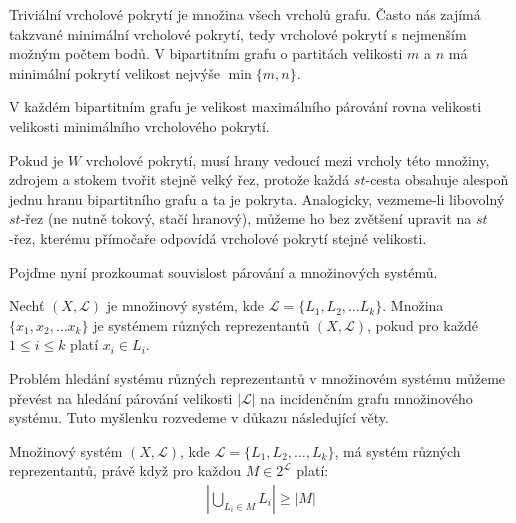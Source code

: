 \begin{t_remark}
  Triviální vrcholové pokrytí je množina všech vrcholů grafu. Často nás zajímá takzvané minimální vrcholové pokrytí, tedy vrcholové pokrytí s nejmenším možným počtem bodů. V bipartitním grafu o partitách velikosti $m$ a $n$ má minimální pokrytí velikost nejvýše $\min\{m,n\}$.
\end{t_remark}

\begin{t_theorem}[Königova]
  V každém bipartitním grafu je velikost maximálního párování rovna velikosti velikosti minimálního vrcholového pokrytí.
\end{t_theorem}

\begin{t_proof}
  Pokud je $W$ vrcholové pokrytí, musí hrany vedoucí mezi vrcholy této množiny, zdrojem a stokem tvořit stejně velký řez, protože každá $st$-cesta obsahuje alespoň jednu hranu bipartitního grafu a ta je pokryta. Analogicky, vezmeme-li libovolný $st$-řez (ne nutně tokový, stačí hranový), můžeme ho bez zvětšení upravit na $st$-řez, kterému přímočaře odpovídá vrcholové pokrytí stejné velikosti.
\end{t_proof}

Pojďme nyní prozkoumat souvislost párování a množinových systémů.

\begin{t_definition}
  Nechť $(X,\mathcal{L})$ je množinový systém, kde $\mathcal{L}=\{L_1,L_2,\dots L_k\}$. Množina $\{x_1,x_2,\dots x_k\}$ je systémem různých reprezentantů $(X,\mathcal{L})$, pokud pro každé $1\leq i\leq k$ platí $x_i\in L_i$.
\end{t_definition}

\begin{t_remark}
  Problém hledání systému různých reprezentantů v množinovém systému můžeme převést na hledání párování velikosti $|\mathcal{L}|$ na incidenčním grafu množinového systému. Tuto myšlenku rozvedeme v důkazu následující věty.
\end{t_remark}

\begin{t_theorem}[Hallova]
  Množinový systém $(X,\mathcal{L})$, kde $\mathcal{L}=\{L_1,L_2,\dots,L_k\}$, má systém různých reprezentantů, právě když pro každou $M\in 2^\mathcal{L}$ platí:
  \begin{align*}
    \left|\bigcup_{L_i\in M} L_i\right|\geq |M|
  \end{align*}
\end{t_theorem}

